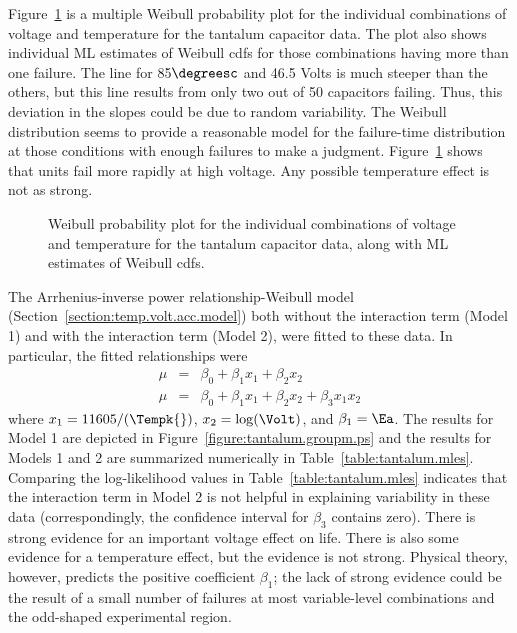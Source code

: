 Figure~\ref{figure:tantalum.groupi.ps} is a multiple Weibull
probability plot for the individual combinations of voltage and
temperature for the tantalum capacitor data. The plot also shows
individual ML estimates of Weibull cdfs for those combinations
having more than one failure. The line for 85$\degreesc$ and 46.5
Volts is much steeper than the others, but this line results from
only two out of 50 capacitors failing. Thus, this deviation in the
slopes could be due to random variability.  The Weibull distribution
seems to provide a reasonable model for the failure-time
distribution at those conditions with enough failures to make a
judgment.  Figure~\ref{figure:tantalum.groupi.ps} shows that units
fail more rapidly at high voltage. Any possible temperature effect
is not as strong.

\begin{figure}
\caption{Weibull probability 
plot for the individual combinations of voltage and temperature for
the tantalum capacitor data, along with ML estimates of Weibull
cdfs.}
\label{figure:tantalum.groupi.ps}
\end{figure}
The Arrhenius-inverse power relationship-Weibull model
(Section~\ref{section:temp.volt.acc.model}) both without the
interaction term (Model 1) and with the interaction term (Model 2),
were fitted to these data. In particular, the fitted relationships were
\begin{eqnarray*}
\mu &=& \beta_{0} + \beta_{1} x_{1}+\beta_{2} x_{2}\\
\mu &=& \beta_{0} + \beta_{1} x_{1}+\beta_{2} x_{2}+ \beta_{3} x_{1} x_{2}
\end{eqnarray*}
where $x_{1}=11605/(\Tempk{})$, $x_{2}=\log(\Volt)$, and
$\beta_{1}=\Ea$.  The results for Model 1 are depicted in
Figure~\ref{figure:tantalum.groupm.ps} and the results for Models 1
and 2 are summarized numerically in Table~\ref{table:tantalum.mles}.
Comparing the log-likelihood values in Table~\ref{table:tantalum.mles}
indicates that the interaction term in Model 2 is not helpful in
explaining variability in these data (correspondingly, the
confidence interval for $\beta_{3}$ contains zero). There is
strong evidence for an important voltage effect on life.  There is
also some evidence for a temperature effect, but the evidence is not
strong. Physical theory, however, predicts the positive coefficient
$\beta_{1}$; the lack of strong evidence could be the result of a small
number of failures at most variable-level combinations and the
odd-shaped experimental region.

